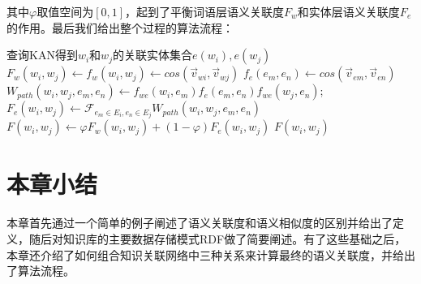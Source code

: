 \noindent 其中$\varphi$取值空间为$[0,1]$，起到了平衡词语层语义关联度$F_w$和实体层语义关联度$F_e$的作用。最后我们给出整个过程的算法流程：

\begin{algorithm}
    \label{alg:kan-sr}
    \BlankLine
    查询KAN得到$w_i$和$w_j$的关联实体集合$e(w_i), e(w_j)$ \;
    $F_w(w_i, w_j) \leftarrow f_w(w_i, w_j) \leftarrow cos(\vec v_{wi},\vec v_{wj})$ \;
     {
        $f_e(e_m, e_n) \leftarrow cos(\vec v_{em},\vec v_{en})$ \;
        $W_{path}(w_i, w_j, e_m, e_n) \leftarrow f_{we}(w_i, e_m)f_e(e_m, e_n)f_{we}(w_j, e_n)$; \;
    }
    $F_e(w_i, w_j) \leftarrow \mathscr{F}_{e_m \in E_i,e_n \in E_j}W_{path}(w_i, w_j, e_m, e_n)$ \;
    $F(w_i, w_j) \leftarrow \varphi F_w(w_i, w_j) + (1 - \varphi) F_e(w_i, w_j)$ \;
    \Return $F(w_i, w_j)$
\end{algorithm}

\section{本章小结}
本章首先通过一个简单的例子阐述了语义关联度和语义相似度的区别并给出了定义，随后对知识库的主要数据存储模式RDF做了简要阐述。有了这些基础之后，本章还介绍了如何组合知识关联网络中三种关系来计算最终的语义关联度，并给出了算法流程。
